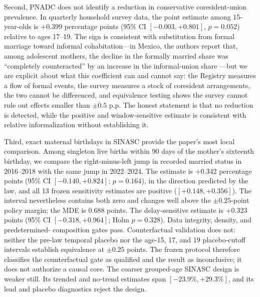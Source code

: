 \documentclass[12pt]{article}
\begin{document}
Second, PNADC does not identify a reduction in conservative coresident-union
prevalence. In quarterly household survey data, the point estimate among 15-year-olds is
$+0.399$ percentage points (95\% CI
$[-0.003, +0.801]$, $p=0.052$) relative to ages 17--19. The sign is consistent with
substitution from formal marriage toward informal cohabitation---in Mexico, the authors
report that, among adolescent mothers, the decline in the formally married share was
``completely counteracted'' by an increase in the informal-union share
\citep{BellesObreroLombardi2023}---but we are explicit about what this coefficient can
and cannot say: the Registry measures a flow of formal events, the survey measures a stock
of coresident arrangements, the two cannot be differenced, and equivalence testing shows
the survey cannot rule out effects smaller than $\pm 0.5$ p.p. The honest statement is
that no reduction is detected, while the positive and window-sensitive estimate is
consistent with relative informalization without establishing it.

Third, exact maternal birthdays in SINASC provide the paper's most local comparison.
Among singleton live births within 90 days of the mother's sixteenth birthday, we compare
the right-minus-left jump in recorded married status in 2016--2018 with the same jump in
2022--2024. The estimate is $+0.342$ percentage points (95\% CI
$[-0.140, +0.824]$; $p=0.164$), in the direction predicted by the law, and all 13 frozen
sensitivity estimates are positive ($[+0.148, +0.356]$). The interval nevertheless
contains both zero and changes well above the $\pm0.25$-point policy margin; the MDE is
$0.688$ points. The delay-sensitive estimate is $+0.323$ points (95\% CI
$[-0.318, +0.964]$; Holm $p=0.328$). Data integrity, density, and predetermined-
composition gates pass. Counterfactual validation does not: neither the pre-law temporal
placebo nor the age-15, 17, and 19 placebo-cutoff intervals establish equivalence at
$\pm0.25$ points. The frozen protocol therefore classifies the counterfactual gate as
qualified and the result as inconclusive; it does not authorize a causal core. The
coarser grouped-age SINASC design is weaker still. Its trended and no-trend estimates
span $[-23.9\%, +29.3\%]$, and its lead and placebo diagnostics reject the design.
\end{document}
